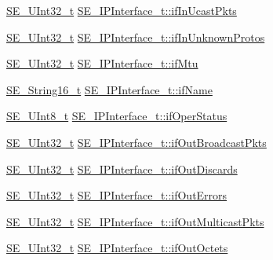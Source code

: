 \begin{DoxyCompactItemize}
\item 
\hyperlink{group__UInt32_ga70bd4ecda3c0c85d20779d685a270cdb}{S\+E\+\_\+\+U\+Int32\+\_\+t} \hyperlink{group__IPInterface_ga989594ca7b45d7a18e3f0e1942252bf0}{S\+E\+\_\+\+I\+P\+Interface\+\_\+t\+::if\+In\+Ucast\+Pkts}
\item 
\hyperlink{group__UInt32_ga70bd4ecda3c0c85d20779d685a270cdb}{S\+E\+\_\+\+U\+Int32\+\_\+t} \hyperlink{group__IPInterface_ga3936236c0938472ca9307c318cc4f271}{S\+E\+\_\+\+I\+P\+Interface\+\_\+t\+::if\+In\+Unknown\+Protos}
\item 
\hyperlink{group__UInt32_ga70bd4ecda3c0c85d20779d685a270cdb}{S\+E\+\_\+\+U\+Int32\+\_\+t} \hyperlink{group__IPInterface_gae6d0c841334279786582a3ceaa179073}{S\+E\+\_\+\+I\+P\+Interface\+\_\+t\+::if\+Mtu}
\item 
\hyperlink{group__String16_ga96799b35e03c3e6545eb138a7f879015}{S\+E\+\_\+\+String16\+\_\+t} \hyperlink{group__IPInterface_ga79ab2f8029d3450151664f54dec7c69b}{S\+E\+\_\+\+I\+P\+Interface\+\_\+t\+::if\+Name}
\item 
\hyperlink{group__UInt8_gaf7c365a1acfe204e3a67c16ed44572f5}{S\+E\+\_\+\+U\+Int8\+\_\+t} \hyperlink{group__IPInterface_ga76e38ca61efa7e59eca32b9fe63b2609}{S\+E\+\_\+\+I\+P\+Interface\+\_\+t\+::if\+Oper\+Status}
\item 
\hyperlink{group__UInt32_ga70bd4ecda3c0c85d20779d685a270cdb}{S\+E\+\_\+\+U\+Int32\+\_\+t} \hyperlink{group__IPInterface_ga4dad26e1a7775e033f822da2980c9715}{S\+E\+\_\+\+I\+P\+Interface\+\_\+t\+::if\+Out\+Broadcast\+Pkts}
\item 
\hyperlink{group__UInt32_ga70bd4ecda3c0c85d20779d685a270cdb}{S\+E\+\_\+\+U\+Int32\+\_\+t} \hyperlink{group__IPInterface_gaa49c6bffe8503a33224296f9d6d305e5}{S\+E\+\_\+\+I\+P\+Interface\+\_\+t\+::if\+Out\+Discards}
\item 
\hyperlink{group__UInt32_ga70bd4ecda3c0c85d20779d685a270cdb}{S\+E\+\_\+\+U\+Int32\+\_\+t} \hyperlink{group__IPInterface_gae2b2d6d1127135cb87d6b714f97756d0}{S\+E\+\_\+\+I\+P\+Interface\+\_\+t\+::if\+Out\+Errors}
\item 
\hyperlink{group__UInt32_ga70bd4ecda3c0c85d20779d685a270cdb}{S\+E\+\_\+\+U\+Int32\+\_\+t} \hyperlink{group__IPInterface_ga7da0c9b44701f1a7d61a18a1c817b68d}{S\+E\+\_\+\+I\+P\+Interface\+\_\+t\+::if\+Out\+Multicast\+Pkts}
\item 
\hyperlink{group__UInt32_ga70bd4ecda3c0c85d20779d685a270cdb}{S\+E\+\_\+\+U\+Int32\+\_\+t} \hyperlink{group__IPInterface_ga1f253af09f8037d596246bd0051af347}{S\+E\+\_\+\+I\+P\+Interface\+\_\+t\+::if\+Out\+Octets}
\item 

\end{DoxyCompactItemize}
